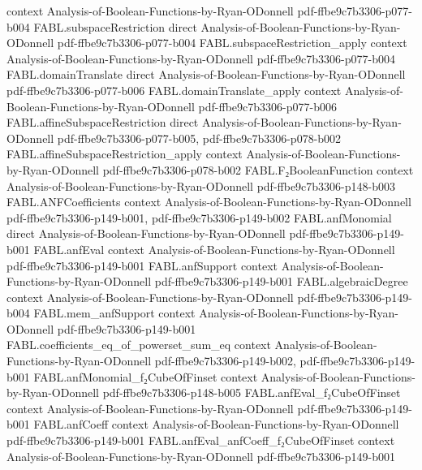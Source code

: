 \begin{theorem}
  {context}
  {Analysis-of-Boolean-Functions-by-Ryan-ODonnell}
  {pdf-ffbe9c7b3306-p077-b004}
\proofstep
  {FABL.subspaceRestriction}
  {direct}
  {Analysis-of-Boolean-Functions-by-Ryan-ODonnell}
  {pdf-ffbe9c7b3306-p077-b004}
\proofstep
  {FABL.subspaceRestriction_apply}
  {context}
  {Analysis-of-Boolean-Functions-by-Ryan-ODonnell}
  {pdf-ffbe9c7b3306-p077-b004}
\proofstep
  {FABL.domainTranslate}
  {direct}
  {Analysis-of-Boolean-Functions-by-Ryan-ODonnell}
  {pdf-ffbe9c7b3306-p077-b006}
\proofstep
  {FABL.domainTranslate_apply}
  {context}
  {Analysis-of-Boolean-Functions-by-Ryan-ODonnell}
  {pdf-ffbe9c7b3306-p077-b006}
\proofstep
  {FABL.affineSubspaceRestriction}
  {direct}
  {Analysis-of-Boolean-Functions-by-Ryan-ODonnell}
  {pdf-ffbe9c7b3306-p077-b005,
    pdf-ffbe9c7b3306-p078-b002}
\proofstep
  {FABL.affineSubspaceRestriction_apply}
  {context}
  {Analysis-of-Boolean-Functions-by-Ryan-ODonnell}
  {pdf-ffbe9c7b3306-p078-b002}
\proofstep
  {FABL.F₂BooleanFunction}
  {context}
  {Analysis-of-Boolean-Functions-by-Ryan-ODonnell}
  {pdf-ffbe9c7b3306-p148-b003}
\proofstep
  {FABL.ANFCoefficients}
  {context}
  {Analysis-of-Boolean-Functions-by-Ryan-ODonnell}
  {pdf-ffbe9c7b3306-p149-b001,
    pdf-ffbe9c7b3306-p149-b002}
\proofstep
  {FABL.anfMonomial}
  {direct}
  {Analysis-of-Boolean-Functions-by-Ryan-ODonnell}
  {pdf-ffbe9c7b3306-p149-b001}
\proofstep
  {FABL.anfEval}
  {context}
  {Analysis-of-Boolean-Functions-by-Ryan-ODonnell}
  {pdf-ffbe9c7b3306-p149-b001}
\proofstep
  {FABL.anfSupport}
  {context}
  {Analysis-of-Boolean-Functions-by-Ryan-ODonnell}
  {pdf-ffbe9c7b3306-p149-b001}
\proofstep
  {FABL.algebraicDegree}
  {context}
  {Analysis-of-Boolean-Functions-by-Ryan-ODonnell}
  {pdf-ffbe9c7b3306-p149-b004}
\proofstep
  {FABL.mem_anfSupport}
  {context}
  {Analysis-of-Boolean-Functions-by-Ryan-ODonnell}
  {pdf-ffbe9c7b3306-p149-b001}
\proofstep
  {FABL.coefficients_eq_of_powerset_sum_eq}
  {context}
  {Analysis-of-Boolean-Functions-by-Ryan-ODonnell}
  {pdf-ffbe9c7b3306-p149-b002,
    pdf-ffbe9c7b3306-p149-b001}
\proofstep
  {FABL.anfMonomial_f₂CubeOfFinset}
  {context}
  {Analysis-of-Boolean-Functions-by-Ryan-ODonnell}
  {pdf-ffbe9c7b3306-p148-b005}
\proofstep
  {FABL.anfEval_f₂CubeOfFinset}
  {context}
  {Analysis-of-Boolean-Functions-by-Ryan-ODonnell}
  {pdf-ffbe9c7b3306-p149-b001}
\proofstep
  {FABL.anfCoeff}
  {context}
  {Analysis-of-Boolean-Functions-by-Ryan-ODonnell}
  {pdf-ffbe9c7b3306-p149-b001}
\proofstep
  {FABL.anfEval_anfCoeff_f₂CubeOfFinset}
  {context}
  {Analysis-of-Boolean-Functions-by-Ryan-ODonnell}
  {pdf-ffbe9c7b3306-p149-b001}

\end{theorem}
